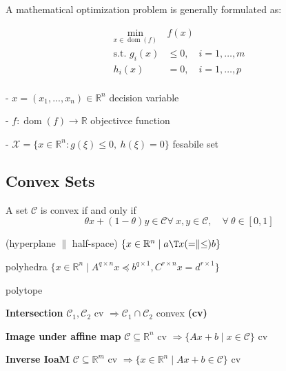 A mathematical optimization problem is generally formulated as:

\begin{equation}
	\begin{aligned}
		\min_{x\in\operatorname{dom}(f)}          & f(x)                      \\
		\text{s.t. }                       g_i(x) & \le 0,\quad i = 1,\dots,m \\
		h_i(x)                                    & = 0,\quad i = 1,\dots,p   \\
	\end{aligned}
	\label{eq:optimization}
\end{equation}

- $x = (x_1,...,x_n) \in \mathbb{R}^{n}$ decision variable

- $f: \operatorname{dom}(f)\to\mathbb{R}$ objectivce function

- $\mathcal{X} = \{x \in \mathbb{R}^{n}: g(\xi)\le0,\ h(\xi)=0\}$ fesabile set


\subsection{Convex Sets}

\begin{definition}
	A set $\mathcal{C}$ is convex if and only if
	$$\theta x + (1-\theta)y \in \mathcal{C}
		\forall\ x,y \in \mathcal{C},\quad
		\forall\ \theta \in [0,1]$$
\end{definition}

(hyperplane $\parallel$ half-space)
$\{x \in \mathbb{R}^n \mid a\T x(=\parallel\le)b\}$

polyhedra $\{x\in\mathbb{R}^n\mid A^{q\times n}x\preceq b^{q\times1},C^{r\times n}x=d^{r\times1}\}$

polytope



\textbf{Intersection}
$\mathcal{C}_1, \mathcal{C}_2$ cv
$\Rightarrow \mathcal{C}_1 \cap \mathcal{C}_2$ convex \textbf{(cv)}

\textbf{Image under affine map}
$\mathcal{C} \subseteq  \mathbb{R}^{n}$ cv
$\Rightarrow \{Ax+b \mid x \in \mathcal{C} \}$ cv

\textbf{Inverse IoaM}
$\mathcal{C} \subseteq  \mathbb{R}^{m}$ cv
$\Rightarrow \{x\in\mathbb{R}^{n} \mid  Ax+b\in\mathcal{C}\}$ cv

